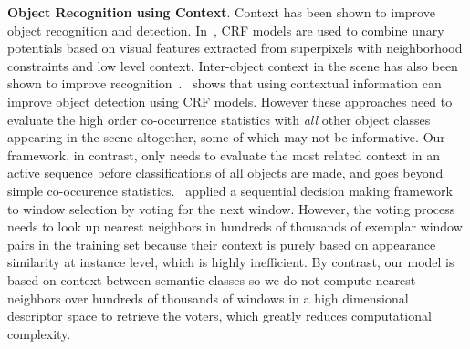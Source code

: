 {\bf Object Recognition using Context}. 
Context has been shown to improve object recognition and detection. In~\cite{gould2009decomposing, shotton2006textonboost, ladicky2010graph}, CRF models are used to combine unary potentials based on visual features extracted from superpixels with neighborhood constraints and low level context. Inter-object context in the scene has also been shown to improve recognition~\cite{galleguillos2010context, chen2011piecing}.~\cite{mottaghi2014role} shows that using contextual information can improve object detection using CRF models. However these approaches need to evaluate the high order co-occurrence statistics with \emph{all} other object classes appearing in the scene altogether, some of which may not be informative. Our framework, in contrast, only needs to evaluate the most related context in an active sequence before classifications of all objects are made, and goes beyond simple co-occurence statistics.~\cite{bogdan2012context} applied a sequential decision making framework to window selection by voting for the next window. However, the voting process needs to look up nearest neighbors in hundreds of thousands of exemplar window pairs in the training set because their context is purely based on appearance similarity at instance level, which is highly inefficient. By contrast, our model is based on context between semantic classes so we do not compute nearest neighbors over hundreds of thousands of windows in a high dimensional descriptor space to retrieve the voters, which greatly reduces computational complexity.
